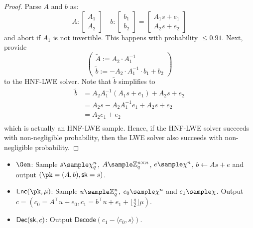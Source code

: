 \begin{lemma}
\end{lemma}
\begin{proof}
    Parse $A$ and $b$ as:
    \[A:\begin{bmatrix} A_1 \\ A_2 \end{bmatrix} \quad b:\begin{bmatrix} b_1 \\ b_2 \end{bmatrix} = \begin{bmatrix} A_1 s + e_1 \\ A_2 s + e_2 \end{bmatrix}\]
    and abort if $A_1$ is not invertible. This happens with probability $\le 0.91$. Next, provide
    \[\begin{pmatrix} \tilde{A} := A_2 \cdot A_1^{-1} \\ \tilde{b} := -A_2 \cdot A_1^{-1} \cdot b_1 + b_2 \end{pmatrix}\] to the HNF-LWE solver. Note that $\tilde{b}$ simplifies to
    \begin{equation*}
        \begin{aligned}
            \tilde{b} & = A_2 A_1^{-1} (A_1 s + e_1) + A_2 s + e_2 \\
                      & = A_2 s - A_2 A_1^{-1} e_1 + A_2 s + e_2   \\
                      & = A_2 e_1 + e_2                            \\
        \end{aligned}
    \end{equation*}
    which is actually an HNF-LWE sample. Hence, if the HNF-LWE solver succeeds with non-negligible probability, then the LWE solver also succeeds with non-negligible probability.
\end{proof}

\begin{construction}
    \hfill
    \begin{itemize}
        \item $\Gen$: Sample $s \sample \chi_q^n$, $A \sample \mathbb{Z}_q^{n \times n}$, $e \sample \chi^n$, $b \gets As + e$ and output $(\pk = (A,b), \sk = s)$.
        \item $\Enc(\pk, \mu)$: Sample $u \sample \mathbb{Z}_q^n$, $e_0 \sample \chi^n$ and $e_1 \sample \chi$. Output $c = (c_0 = A^\intercal u + e_0,c_1 =  b^\intercal u + e_1 + \lfloor\frac{q}{2}\rfloor\mu)$.
        \item $\mathsf{Dec}(\mathsf{sk}, c)$: Output $\mathsf{Decode}(c_1 - \langle c_0, s\rangle)$.
    \end{itemize}
\end{construction}

